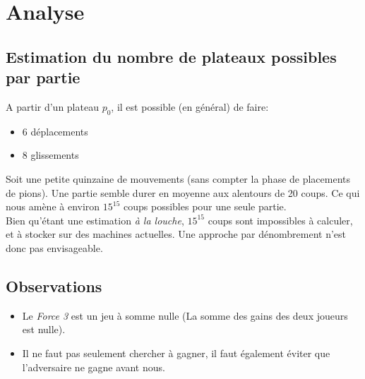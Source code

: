 \documentclass[a4paper,12pt]{article}
\begin{document}
\section{Analyse}
\subsection{Estimation du nombre de plateaux possibles par partie}
A partir d'un plateau $p_0$, il est possible (en général) de faire:
\begin{itemize}
	\item 6 déplacements
	\item 8 glissements
\end{itemize}

Soit une petite quinzaine de mouvements (sans compter la phase de placements de pions). Une partie semble durer en moyenne aux alentours de 20 coups. Ce qui nous amène à environ $15^{15}$ coups possibles pour une seule partie.\\

Bien qu'étant une estimation \emph{à la louche}, $15^{15}$ coups sont impossibles à calculer, et à stocker sur des machines actuelles. Une approche par dénombrement n'est donc pas envisageable.

\subsection{Observations}
\begin{itemize}
	\item Le \emph{Force 3} est un jeu à somme nulle (La somme des gains des deux joueurs est nulle).
	\item Il ne faut pas seulement chercher à gagner, il faut également éviter que l'adversaire ne gagne avant nous.
\end{itemize}

\newpage
\end{document}
